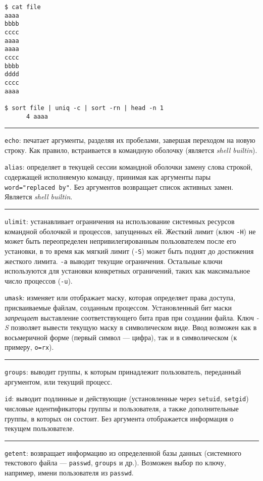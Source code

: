 \documentclass[listings]{labreport}
\begin{document}
\begin{verbatim}
$ cat file
aaaa
bbbb
cccc
aaaa
aaaa
cccc
bbbb
dddd
cccc
aaaa

$ sort file | uniq -c | sort -rn | head -n 1
      4 aaaa
\end{verbatim}

\noindent\rule{\textwidth}{1pt}

\texttt{echo}: печатает аргументы, разделяя их пробелами, завершая переходом на новую строку. Как
правило, встраивается в командную оболочку (является \textit{shell builtin}).

\texttt{alias}: определяет в текущей сессии командной оболочки замену слова строкой, содержащей
исполняемую команду, принимая как аргументы пары \texttt{word="replaced by"}. Без аргументов
возвращает список активных замен. Является \textit{shell builtin}.

\noindent\rule{\textwidth}{1pt}

\texttt{ulimit}: устанавливает ограничения на использование системных ресурсов командной оболочкой
и процессов, запущенных ей. Жесткий лимит (ключ \texttt{-H}) не может быть переопределен
непривилегированным пользователем после его установки, в то время как мягкий лимит (\texttt{-S})
может быть поднят до достижения жесткого лимита. \texttt{-a} выводит текущие ограничения.
Остальные ключи используются для установки конкретных ограничений, таких как максимальное
число процессов (\texttt{-u}).

\texttt{umask}: изменяет или отображает маску, которая определяет права доступа, присваиваемые файлам,
созданным процессом. Установленный бит маски \textit{запрещает} выставление соответствующего бита прав
при создании файла. Ключ \textit{-S} позволяет вывести текущую маску в символическом виде. Ввод
возможен как в восьмеричной форме (первый символ — цифра), так и в символическом (к примеру, \texttt{o=rx}).

\noindent\rule{\textwidth}{1pt}

\texttt{groups}: выводит группы, к которым принадлежит пользователь, переданный аргументом, или текущий процесс.

\texttt{id}: выводит подлинные и действующие (установленные через \texttt{setuid}, \texttt{setgid})
числовые идентификаторы группы и пользователя, а также дополнительные группы, в которых он состоит.
Без аргумента отображается информация о текущем пользователе.

\noindent\rule{\textwidth}{1pt}

\texttt{getent}: возвращает информацию из определенной базы данных (системного текстового файла — \texttt{passwd}, \texttt{groups} и др.).
Возможен выбор по ключу, например, имени пользователя из \texttt{passwd}.
\end{document}
